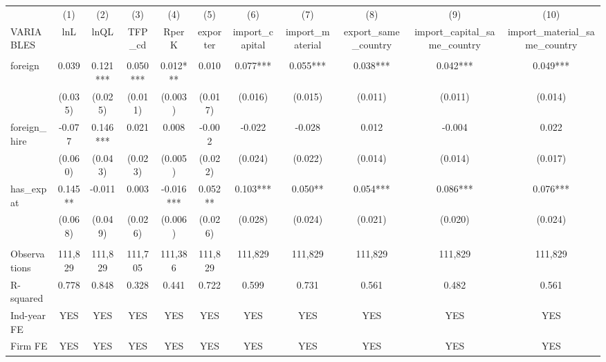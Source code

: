 \begin{tabular}{lcccccccccc} \hline
 & (1) & (2) & (3) & (4) & (5) & (6) & (7) & (8) & (9) & (10) \\
VARIABLES & lnL & lnQL & TFP\_cd & RperK & exporter & import\_capital & import\_material & export\_same\_country & import\_capital\_same\_country & import\_material\_same\_country \\ \hline
 &  &  &  &  &  &  &  &  &  &  \\
foreign & 0.039 & 0.121*** & 0.050*** & 0.012*** & 0.010 & 0.077*** & 0.055*** & 0.038*** & 0.042*** & 0.049*** \\
 & (0.035) & (0.025) & (0.011) & (0.003) & (0.017) & (0.016) & (0.015) & (0.011) & (0.011) & (0.014) \\
foreign\_hire & -0.077 & 0.146*** & 0.021 & 0.008 & -0.002 & -0.022 & -0.028 & 0.012 & -0.004 & 0.022 \\
 & (0.060) & (0.043) & (0.023) & (0.005) & (0.022) & (0.024) & (0.022) & (0.014) & (0.014) & (0.017) \\
has\_expat & 0.145** & -0.011 & 0.003 & -0.016*** & 0.052** & 0.103*** & 0.050** & 0.054*** & 0.086*** & 0.076*** \\
 & (0.068) & (0.049) & (0.026) & (0.006) & (0.026) & (0.028) & (0.024) & (0.021) & (0.020) & (0.024) \\
 &  &  &  &  &  &  &  &  &  &  \\
Observations & 111,829 & 111,829 & 111,705 & 111,386 & 111,829 & 111,829 & 111,829 & 111,829 & 111,829 & 111,829 \\
R-squared & 0.778 & 0.848 & 0.328 & 0.441 & 0.722 & 0.599 & 0.731 & 0.561 & 0.482 & 0.561 \\
Ind-year FE & YES & YES & YES & YES & YES & YES & YES & YES & YES & YES \\
 Firm FE & YES & YES & YES & YES & YES & YES & YES & YES & YES & YES \\ \hline
\end{tabular}
